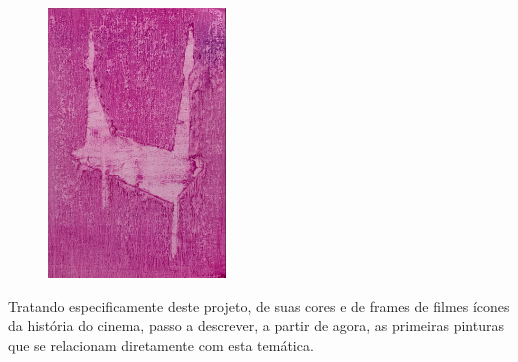 \begin{figure}
	\caption{}

	\includegraphics[width=1.85297in,height=2.81553in]{figuras/boudet-memoria-inercia-2021.pdf.compressed.pdf}
\end{figure}

Tratando especificamente deste projeto, de suas cores e de frames de
filmes ícones da história do cinema, passo a descrever, a partir de
agora, as primeiras pinturas que se relacionam diretamente com esta
temática.

